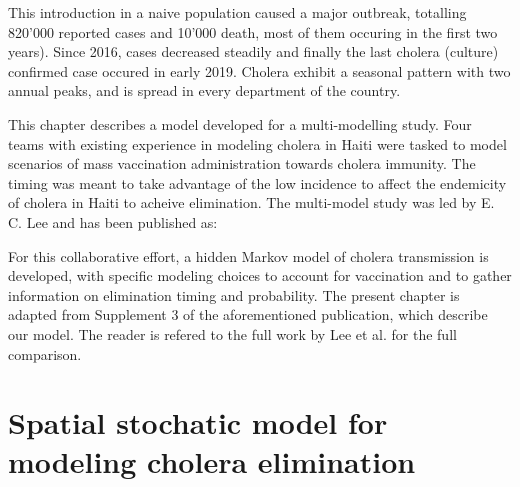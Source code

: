 This introduction in a naive population caused a major outbreak, totalling 820'000 reported cases and 10'000 death, most of them occuring in the first two years\cite{Barzilay:CholeraSurveillanceHaiti:2013}).  Since 2016, cases decreased steadily and finally the last cholera (culture) confirmed case occured in early 2019\cite{RepubliquedHaiti:ProfilStatistiqueCholera}. Cholera exhibit a seasonal pattern with two annual peaks, and is spread in every department of the country.

This chapter describes a model developed for a multi-modelling study. Four teams with existing experience in modeling cholera in Haiti were tasked to model scenarios of mass vaccination administration towards cholera immunity. The timing was meant to take advantage of the low incidence to affect the endemicity of cholera in Haiti to acheive elimination. The multi-model study was led by E. C. Lee and has been published as:
\begin{fullwidth}
\end{fullwidth}

For this collaborative effort, a hidden Markov model of cholera transmission is developed, with specific modeling choices to account for vaccination and to gather information on elimination timing and probability.
The present chapter is adapted from Supplement 3 of the aforementioned publication, which describe our model. The reader is refered to the full work by Lee et al. for the full comparison.

\section{Spatial stochatic model for modeling cholera elimination}

